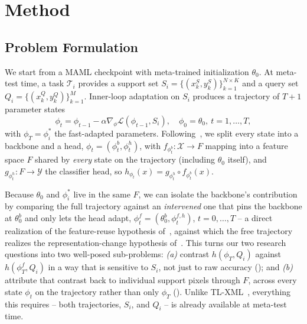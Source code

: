 \section{Method}
\label{sec:method}

\subsection{Problem Formulation}
\label{sec:problem}

We start from a MAML checkpoint with meta-trained initialization $\theta_0$. At meta-test time, a task $\mathcal{T}_i$ provides a support set $S_i=\{(x_k^S,y_k^S)\}_{k=1}^{N\times K}$ and a query set $Q_i=\{(x_k^Q,y_k^Q)\}_{k=1}^{M}$. Inner-loop adaptation on $S_i$ produces a trajectory of $T{+}1$ parameter states
\begin{equation}
    \phi_{t} = \phi_{t-1} - \alpha \nabla_{\phi} \mathcal{L}(\phi_{t-1}, S_i), \quad \phi_0=\theta_0,\ t=1,\dots,T,
    \label{eq:inner_loop}
\end{equation}
with $\phi_T=\phi_i^*$ the fast-adapted parameters. Following~\cite{raghu2019rapid,oh2020boil}, we split every state into a backbone and a head, $\phi_t=(\phi_t^{b},\phi_t^{h})$, with $f_{\phi_t^{b}}\!:\mathcal{X}\!\to\!F$ mapping into a feature space $F$ shared by \emph{every} state on the trajectory (including $\theta_0$ itself), and $g_{\phi_t^{h}}\!:\!F\!\to\!\mathcal{Y}$ the classifier head, so $h_{\phi_t}(x)=g_{\phi_t^h}\!\circ\! f_{\phi_t^b}(x)$.

Because $\theta_0$ and $\phi_i^*$ live in the same $F$, we can isolate the backbone's contribution by comparing the full trajectory against an \emph{intervened} one that pins the backbone at $\theta_0^{b}$ and only lets the head adapt, $\phi_t^{f}=(\theta_0^{b},\phi_t^{f,h})$, $t=0,\dots,T$ -- a direct realization of the feature-reuse hypothesis of~\cite{raghu2019rapid}, against which the free trajectory realizes the representation-change hypothesis of~\cite{oh2020boil}. This turns our two research questions into two well-posed sub-problems: \emph{(a)} contrast $h(\phi_T,Q_i)$ against $h(\phi_T^{f},Q_i)$ in a way that is sensitive to $S_i$, not just to raw accuracy (); and \emph{(b)} attribute that contrast back to individual support pixels through $F$, across every state $\phi_{t}$ on the trajectory rather than only $\phi_T$ (). Unlike TL-XML~\cite{mitsuka2025tlxml}, everything this requires -- both trajectories, $S_i$, and $Q_i$ -- is already available at meta-test time.

